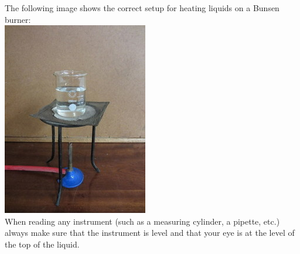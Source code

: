 The following image shows the correct setup for heating liquids on a Bunsen burner:\\
\includegraphics[width=.3\textwidth]{photos/beaker_tripod.jpg}\\
When reading any instrument (such as a measuring cylinder, a pipette, etc.) always make sure that the instrument is level and that your eye is at the level of the top of the liquid.

